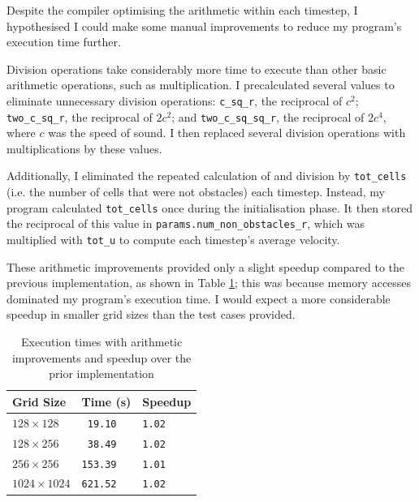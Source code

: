 \documentclass[twocolumn, a4paper]{article}
\begin{document}
Despite the compiler optimising the arithmetic within each timestep, I hypothesised I could make some manual improvements to reduce my program's execution time further.

Division operations take considerably more time to execute than other basic arithmetic operations, such as multiplication.
I precalculated several values to eliminate unnecessary division operations: \texttt{c\_sq\_r}, the reciprocal of $c^2$; \texttt{two\_c\_sq\_r}, the reciprocal of $2c^2$; and \texttt{two\_c\_sq\_sq\_r}, the reciprocal of $2c^4$, where $c$ was the speed of sound.
I then replaced several division operations with multiplications by these values.

Additionally, I eliminated the repeated calculation of and division by \texttt{tot\_cells} (i.e. the number of cells that were not obstacles) each timestep.
Instead, my program calculated \texttt{tot\_cells} once during the initialisation phase.
It then stored the reciprocal of this value in \texttt{params.num\_non\_obstacles\_r}, which was multiplied with \texttt{tot\_u} to compute each timestep's average velocity.

These arithmetic improvements provided only a slight speedup compared to the previous implementation, as shown in Table \ref{tab:arithmetic_improvements}; this was because memory accesses dominated my program's execution time.
I would expect a more considerable speedup in smaller grid sizes than the test cases provided.

\begin{table}[htbp]
  \begin{center}
  \caption{Execution times with arithmetic improvements and speedup over the prior implementation}\label{tab:arithmetic_improvements}
  \begin{tabular}[t]{l | l l} 
      \hline\hline
      Grid Size&Time (s)&Speedup\\
      \hline
      $128 \times 128$&\texttt{ 19.10}&\texttt{1.02}\\
      $128 \times 256$&\texttt{ 38.49}&\texttt{1.02}\\
      $256 \times 256$&\texttt{153.39}&\texttt{1.01}\\
      $1024 \times 1024$&\texttt{621.52}&\texttt{1.02}\\
      \hline
    \end{tabular}
  \end{center}
  \vspace{-1em}
\end{table}
\end{document}
